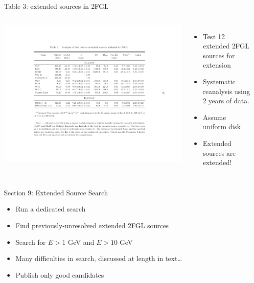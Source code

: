 \documentclass[12pt]{beamer}
\begin{document}
\begin{frame}{Table 3: extended sources in 2FGL}
  \begin{columns}
    \includegraphics[scale=0.4]{plots/table_reanalysis.pdf}
    \begin{itemize}
      \item Test 12 extended 2FGL sources for extension
      \item Systematic reanalysis using 2 years of data.
      \item Assume uniform disk
      \item Extended sources are extended!
    \end{itemize}
  \end{columns}
\end{frame}

\begin{frame}{Section 9: Extended Source Search}
  \begin{itemize}
    \item Run a dedicated search 
    \item Find previously-unresolved
      extended 2FGL sources
    \item Search for $E>1$ GeV and $E>10$ GeV
    \item Many difficulties in search, discussed at length in text\dots
    \item Publish only good candidates
  \end{itemize}
\end{frame}
\end{document}
